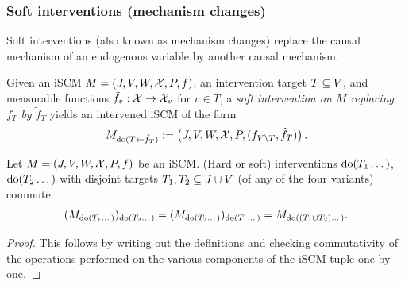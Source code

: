 
\subsubsection{Soft interventions (mechanism changes)}

Soft interventions (also known as mechanism changes) replace the causal mechanism of an endogenous variable by another causal mechanism.

\begin{Def}\label{def:scm_soft_intervention}
  Given an iSCM $M = \left ( J, V, W, \mathcal{X}, P, f \right )$, an intervention target $T \subseteq V$, 
  and measurable functions $\tilde{f}_v : \mathcal{X} \to \mathcal{X}_v$ for $v \in T$,
  a \emph{soft intervention on $M$ replacing $f_T$ by $\tilde f_T$} yields an intervened iSCM of the form
  $$M_{\operatorname{do}(T \mathrel{\leftarrow} \tilde{f}_T)} := \left ( J,V,W,\mathcal{X},P,(f_{V\setminus T}, \tilde{f}_T) \right ).$$
\end{Def}

\begin{Prp}\label{prp:interventions_commute}
Let $M = \left ( J, V, W, \mathcal{X}, P, f \right )$ be an iSCM.
(Hard or soft) interventions $\operatorname{do}(T_1\dots)$, $\operatorname{do}(T_2\dots)$ with disjoint targets $T_1, T_2 \subseteq J \cup V$ (of any of the four variants) commute:
  $$(M_{\operatorname{do}(T_1\dots)})_{\operatorname{do}(T_2\dots)} = (M_{\operatorname{do}(T_2\dots)})_{\operatorname{do}(T_1\dots)} = M_{\operatorname{do}((T_1 \cup T_2)\dots)}.$$
\end{Prp}
\begin{proof}
  This follows by writing out the definitions and checking commutativity of the operations performed on the various components of the iSCM tuple one-by-one.
\end{proof}

